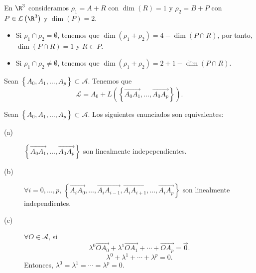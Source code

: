 \begin{eg}
\normalfont En $\displaystyle \R^{3} $ consideramos $\displaystyle \rho_{1} = A + R $ con $\displaystyle \dim\left(R\right)=1 $ y $\displaystyle \rho_{2} = B + P $ con $\displaystyle P \in \mathcal{L}\left(\R^{3}\right) $ y $\displaystyle \dim\left(P\right) = 2 $. 
\begin{itemize}
\item Si $\displaystyle \rho_{1} \cap \rho_{2} = \emptyset $, tenemos que $\displaystyle \dim\left(\rho_{1} + \rho_{2}\right) = 4 - \dim\left(P \cap R\right) $, por tanto, $\displaystyle \dim\left(P \cap R\right) = 1 $ y $\displaystyle R \subset P $.
\item Si $\displaystyle \rho_{1} \cap \rho_{2} \neq \emptyset $, tenemos que $\displaystyle \dim\left(\rho_{1} + \rho_{2}\right) = 2 + 1 - \dim\left(P \cap R\right) $. 
\end{itemize}
\end{eg}
\begin{observation}
\normalfont 
Sean $\displaystyle \left\{ A_{0}, A_{1}, \ldots, A_{p}\right\} \subset \mathcal{A} $. Tenemos que 
\[ \mathcal{L} = A_{0} + L\left( \left\{ \overrightarrow{A_{0}A_{1}}, \ldots, \overrightarrow{A_{0}A_{p}}\right\} \right) .\]
\end{observation}
\begin{fprop}[]
	\normalfont Sean $\displaystyle \left\{ A_{0}, A_{1}, \ldots, A_{p}\right\}  \subset \mathcal{A} $. Los siguientes enunciados son equivalentes:
	\begin{description}
		\item[(a)] $\displaystyle \left\{\overrightarrow{A_{0}A_{1}}, \ldots, \overrightarrow{A_{0}A_{p}}\right\} $ son linealmente indepependientes.
		\item[(b)] $\displaystyle \forall i = 0, \ldots, p $, $\displaystyle \left\{ \overrightarrow{A_{i}A_{0}}, \ldots, \overrightarrow{A_{i}A_{i - 1}}, \overrightarrow{A_{i}A_{i+1}}, \ldots, \overrightarrow{A_{i}A_{p}}\right\}  $ son linealmente independientes.
		\item[(c)] $\displaystyle \forall O \in \mathcal{A} $, si 
			\[ \lambda^{0}\overrightarrow{OA_{0}} + \lambda^{1}\overrightarrow{OA_{1}} + \cdots + \overrightarrow{OA_{p}} = \vec{0}.\]
			\[\lambda^{0} + \lambda^{1} + \cdots + \lambda^{p} = 0 .\]
			Entonces, $\displaystyle \lambda^{0}= \lambda^{1} = \cdots = \lambda^{ p}=0 $.
	\end{description}
\end{fprop}
